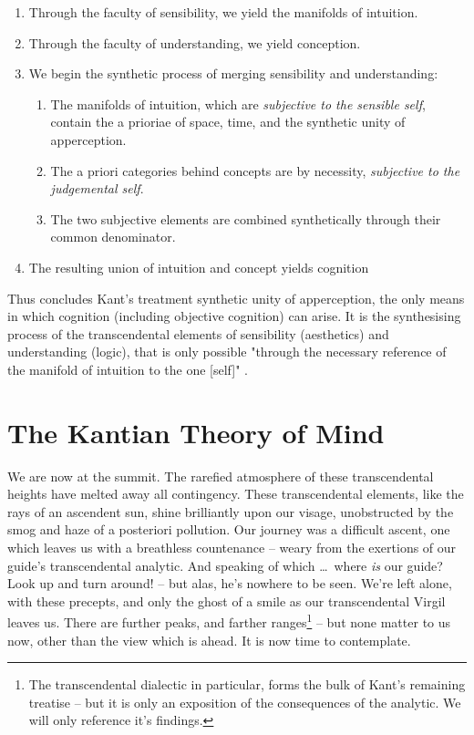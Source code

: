 
\begin{enumerate}
  \item Through the faculty of sensibility, we yield the manifolds of intuition.
  \item Through the faculty of understanding, we yield conception.
  \item We begin the synthetic process of merging sensibility and understanding:
  \begin{enumerate}
    \item The manifolds of intuition, which are \emph{subjective to the sensible self}, contain the a prioriae of space, time, and the synthetic unity of apperception.
    \item The a priori categories behind concepts are by necessity, \emph{subjective to the judgemental self}.
    \item The two subjective elements are combined synthetically through their common denominator.
  \end{enumerate}
  \item The resulting union of intuition and concept yields cognition
\end{enumerate}

\noindent
Thus concludes Kant's treatment synthetic unity of apperception, the only means in which cognition (including objective cognition) can arise. It is the synthesising process of the transcendental elements of sensibility (aesthetics) and understanding (logic), that is only possible "through the necessary reference of the manifold of intuition to the one [self]" \autocite[B140]{hackett}.

\section*{The Kantian Theory of Mind}
We are now at the summit. The rarefied atmosphere of these transcendental heights have melted away all contingency. These transcendental elements, like the rays of an ascendent sun, shine brilliantly upon our visage, unobstructed by the smog and haze of a posteriori pollution. Our journey was a difficult ascent, one which leaves us with a breathless countenance -- weary from the exertions of our guide's transcendental analytic. And speaking of which \ldots\ where \emph{is} our guide? Look up and turn around! -- but alas, he's nowhere to be seen. We're left alone, with these precepts, and only the ghost of a smile as our transcendental Virgil leaves us. There are further peaks, and farther ranges\footnote{The transcendental dialectic in particular, forms the bulk of Kant's remaining treatise -- but it is only an exposition of the consequences of the analytic. We will only reference it's findings.} -- but none matter to us now, other than the view which is ahead. It is now time to contemplate.

